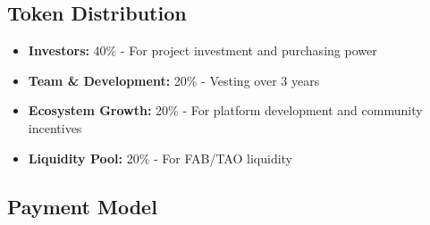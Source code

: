 \subsection*{Token Distribution}
\begin{itemize}[leftmargin=*]
    \item \textbf{Investors:} 40\% - For project investment and purchasing power
    \item \textbf{Team \& Development:} 20\% - Vesting over 3 years
    \item \textbf{Ecosystem Growth:} 20\% - For platform development and community incentives
    \item \textbf{Liquidity Pool:} 20\% - For FAB/TAO liquidity
\end{itemize}

\subsection*{Payment Model}
